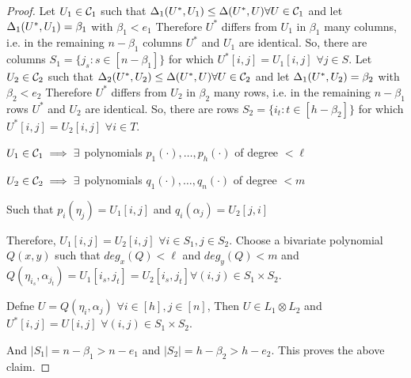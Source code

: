 \begin{proof}
	Let $U_1 \in \mathcal{C}_1$  such that $\Delta_1(U^\ast, U_1) \leq \Delta(U^\ast, U) \forall U\in \mathcal{C}_1$ and let $\Delta_1(U^\ast, U_1) = \beta_1$ with $\beta_1<e_1$
	Therefore $U^\ast$ differs from $U_1$ in $\beta_1$ many columns, i.e. in the remaining $n-\beta_1$ columns $U^\ast$ and $U_1$ are identical.
	So, there are columns $S_1 = \{j_{s} : s\in [n - \beta_1] \}$ for which $U^\ast[i,j] = U_1[i,j]$ $\forall j\in S$.
	Let $U_2 \in \mathcal{C}_2$  such that $\Delta_2(U^\ast, U_2) \leq \Delta(U^\ast, U) \forall U\in \mathcal{C}_2$ and let $\Delta_1(U^\ast, U_2) = \beta_2$ with $\beta_2<e_2$
	Therefore $U^\ast$ differs from $U_2$ in $\beta_2$ many rows, i.e. in the remaining $n-\beta_1$ rows $U^\ast$ and $U_2$ are identical.
	So, there are rows $S_2 = \{i_{t} : t\in [h - \beta_2] \}$ for which $U^\ast[i,j] = U_2[i,j]$ $\forall i\in T$.
	
	$U_1\in \mathcal{C}_1 \implies \exists$ polynomials $p_1(\cdot), \ldots, p_h(\cdot)$ of degree $< \ell$
	
	$U_2\in \mathcal{C}_2 \implies \exists$ polynomials $q_1(\cdot), \ldots, q_n(\cdot)$ of degree $< m$
	
	Such that $p_i(\eta_j) = U_1[i,j] $ and $ q_i(\alpha_j) = U_2[j,i]$
	
	Therefore, $U_1[i,j] = U_2[i,j]$ $\forall i\in S_1, j\in S_2$. Choose a bivariate polynomial $Q(x,y)$ such that $deg_x(Q)<\ell $ and $deg_y(Q)<m$ and $Q(\eta_{i_s}, \alpha_{j_t}) = U_1[i_s,j_t] = U_2[i_s,j_t] \forall (i, j)\in S_1\times S_2$. 
	
	Defne $U = Q(\eta_i,\alpha_j)$ $\forall i\in[h], j\in[n]$, Then $U \in L_1\otimes L_2$ and $U^\ast[i,j] = U[i,j]$ $\forall (i,j) \in S_1 \times S_2$.
	
	And $|S_1|= n-\beta_1 > n-e_1$ and $|S_2|= h-\beta_2 > h-e_2$.
	This proves the above claim.	
\end{proof}
 


